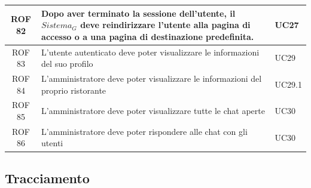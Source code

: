 \documentclass[12pt, oneside]{article}
\begin{document}
\begin{longtable}{|c|p{14cm}|p{2cm}|}
    \hline
    ROF 82 & Dopo aver terminato la sessione dell'utente, il $\textit{Sistema}_G$ deve reindirizzare l'utente alla pagina di accesso o a una pagina di destinazione predefinita. & UC27 \\
    \hline
    ROF 83 & L'utente autenticato deve poter visualizzare le informazioni del suo profilo & UC29 \\ 
    \hline
    ROF 84 & L'amministratore deve poter visualizzare le informazioni del proprio ristorante & UC29.1 \\
    \hline
    ROF 85 & L'amministratore deve poter visualizzare tutte le chat aperte & UC30 \\
    \hline
    ROF 86 & L'amministratore deve poter rispondere alle chat con gli utenti & UC30 \\
    \hline
\end{longtable}
\newpage

\setlength{\extrarowheight}{8pt}
\subsection{Tracciamento}
\end{document}
